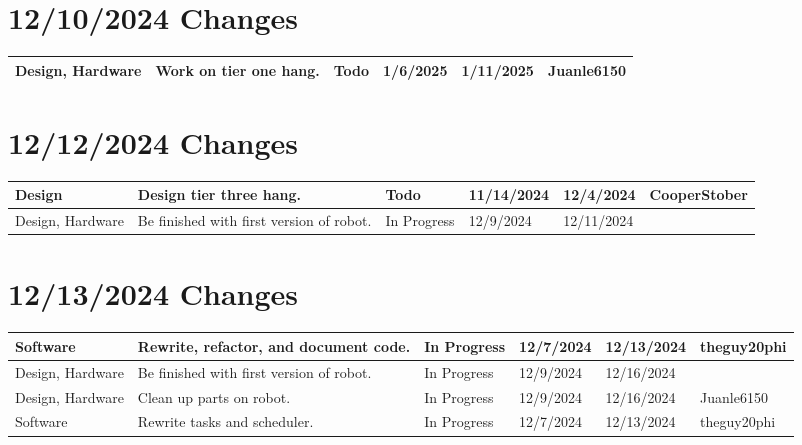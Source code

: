 \section{12/10/2024 Changes}
\begin{center}
\begin{longtable}{| p{40pt} | p{150pt} | p{35pt} | p{33pt} | p{33pt} | p{40pt} |}
\hline \rowcolor{IndianRed1}
Design, Hardware & Work on tier one hang. & Todo & 1/6/2025 & 1/11/2025 & Juanle6150 \\
\hline
\end{longtable}
\end{center}


\section{12/12/2024 Changes}
\begin{center}
\begin{longtable}{| p{40pt} | p{150pt} | p{35pt} | p{33pt} | p{33pt} | p{40pt} |}
\hline \rowcolor{IndianRed1}
Design & Design tier three hang. & Todo & 11/14/2024 & 12/4/2024 & CooperStober \\
\hline \rowcolor{LightGoldenrod1}
Design, Hardware & Be finished with first version of robot. & In Progress & 12/9/2024 & 12/11/2024 & \\
\hline
\end{longtable}
\end{center}


\section{12/13/2024 Changes}
\begin{center}
\begin{longtable}{| p{40pt} | p{150pt} | p{35pt} | p{33pt} | p{33pt} | p{40pt} |}
\hline \rowcolor{LightGoldenrod1}
Software & Rewrite, refactor, and document code. & In Progress & 12/7/2024 & 12/13/2024 & theguy20phi \\
\hline \rowcolor{LightGoldenrod1}
Design, Hardware & Be finished with first version of robot. & In Progress & 12/9/2024 & 12/16/2024 & \\
\hline \rowcolor{LightGoldenrod1}
Design, Hardware & Clean up parts on robot. & In Progress & 12/9/2024 & 12/16/2024 & Juanle6150 \\
\hline \rowcolor{LightGoldenrod1}
Software & Rewrite tasks and scheduler. & In Progress & 12/7/2024 & 12/13/2024 & theguy20phi \\
\hline
\end{longtable}
\end{center}



